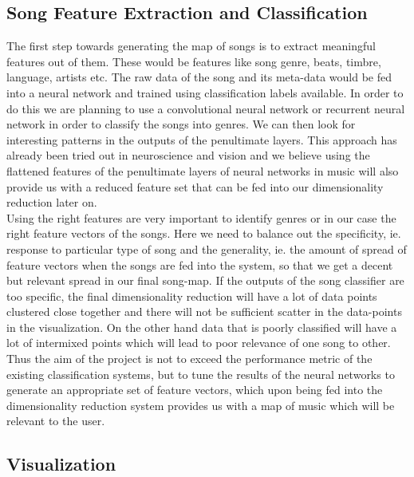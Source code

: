 \documentclass[10pt,twocolumn,letterpaper]{article}
\begin{document}
\subsection{Song Feature Extraction and Classification}

The first step towards generating the map of songs is to extract meaningful features out of them. These would be features like song genre, beats, timbre, language, artists etc. The raw data of the song and its meta-data would be fed into a neural network and trained using classification labels available. In order to do this we are planning to use a convolutional neural network  or recurrent neural network in order to classify the songs into genres. We can then look for interesting patterns in the outputs of the penultimate layers. This approach has already been tried out in neuroscience and vision \cite{rohit2011convolutional} and we believe using the flattened features of the penultimate layers of neural networks in music will also provide us with a reduced feature set that can be fed into our dimensionality reduction later on.\\

Using the right features are very important to identify genres \cite{zheng2017music} or in our case the right feature vectors of the songs. Here we need to balance out the specificity, ie. response to particular type of song and the generality, ie. the amount of spread of feature vectors when the songs are fed into the system, so that we get a decent but relevant spread in our final song-map. If the outputs of the song classifier are too specific, the final dimensionality reduction will have a lot of data points clustered close together and there will not be sufficient scatter in the data-points in the visualization. On the other hand data that is poorly classified will have a lot of intermixed points which will lead to poor relevance of one song to other.\\

 Thus the aim of the project is not to exceed the performance metric of the existing classification systems, but to tune the results of the neural networks to generate an appropriate set of feature vectors, which upon being fed into the dimensionality reduction system provides us with a map of music which will be relevant to the user.

\subsection{Visualization}
\end{document}
